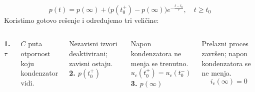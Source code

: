 \begin{frame}[label=08-s053]
\[p(t)=p(\infty)+\bigl(p(t_0^+)-p(\infty)\bigr)e^{-\frac{t-t_0}{\tau}},\quad t\geq t_0\]
Koristimo gotovo rešenje i određujemo tri veličine:\par\medskip
\begin{columns}[T,onlytextwidth]
\textbf{\alert{1. $\tau$}}\par\medskip
$C$ puta otpornost koju kondenzator vidi.\par
Nezavisni izvori deaktivirani; zavisni ostaju.
\textbf{\alert{2. $p(t_0^+)$}}\par\medskip
Napon kondenzatora ne menja se trenutno.
\[u_c(t_0^+)=u_c(t_0^-)\]
\textbf{\alert{3. $p(\infty)$}}\par\medskip
Prelazni proces završen; napon kondenzatora se ne menja.
\[i_c(\infty)=0\]
\end{columns}
\end{frame}
